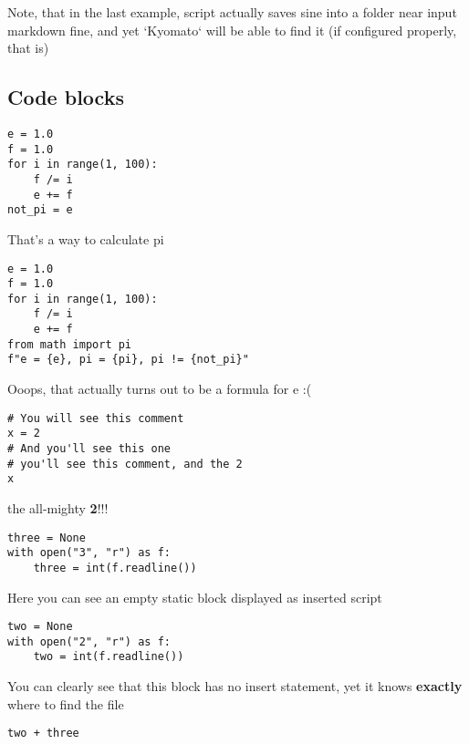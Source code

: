 \documentclass[a4paper]{article}
\newcommand{\tb}{
    \hspace*{10mm}
} %
\begin{document}
\tb Note, that in the last example, script actually saves sine into a folder near input markdown fine, and yet `Kyomato` will be able to find it (if configured properly, that is)
\subsection{Code blocks}

\begin{verbatim}
e = 1.0
f = 1.0
for i in range(1, 100):
    f /= i
    e += f
not_pi = e
\end{verbatim}

That's a way to calculate pi \\

\begin{verbatim}
e = 1.0
f = 1.0
for i in range(1, 100):
    f /= i
    e += f
from math import pi
f"e = {e}, pi = {pi}, pi != {not_pi}"
\end{verbatim}

Ooops, that actually turns out to be a formula for e :( \\

\begin{verbatim}
# You will see this comment
x = 2
# And you'll see this one
# you'll see this comment, and the 2
x
\end{verbatim}

the all-mighty \textbf{2}!!! \\

\begin{verbatim}
three = None
with open("3", "r") as f:
    three = int(f.readline())

\end{verbatim}

Here you can see an empty static block displayed as inserted script \\

\begin{verbatim}
two = None
with open("2", "r") as f:
    two = int(f.readline())
\end{verbatim}

You can clearly see that this block has no insert statement, yet it knows \textbf{exactly} where to find the file \\

\begin{verbatim}
two + three
\end{verbatim}
\end{document}
